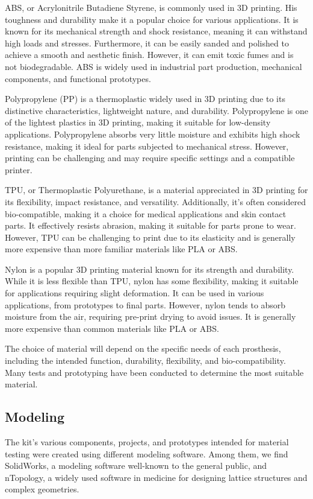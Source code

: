 ABS, or Acrylonitrile Butadiene Styrene, is commonly used in 3D printing. His toughness and durability make it a popular choice for various applications. It is known for its mechanical strength and shock resistance, meaning it can withstand high loads and stresses. Furthermore, it can be easily sanded and polished to achieve a smooth and aesthetic finish. However, it can emit toxic fumes and is not biodegradable. ABS is widely used in industrial part production, mechanical components, and functional prototypes. 

Polypropylene (PP) is a thermoplastic widely used in 3D printing due to its distinctive characteristics, lightweight nature, and durability. Polypropylene is one of the lightest plastics in 3D printing, making it suitable for low-density applications. Polypropylene absorbs very little moisture and exhibits high shock resistance, making it ideal for parts subjected to mechanical stress. However, printing can be challenging and may require specific settings and a compatible printer.

TPU, or Thermoplastic Polyurethane, is a material appreciated in 3D printing for its flexibility, impact resistance, and versatility. Additionally, it’s often considered bio-compatible, making it a choice for medical applications and skin contact parts. It effectively resists abrasion, making it suitable for parts prone to wear. However, TPU can be challenging to print due to its elasticity and is generally more expensive than more familiar materials like PLA or ABS.

Nylon is a popular 3D printing material known for its strength and durability. While it is less flexible than TPU, nylon has some flexibility, making it suitable for applications requiring slight deformation. It can be used in various applications, from prototypes to final parts. However, nylon tends to absorb moisture from the air, requiring pre-print drying to avoid issues. It is generally more expensive than common materials like PLA or ABS.

The choice of material will depend on the specific needs of each prosthesis, including the intended function, durability, flexibility, and bio-compatibility. Many tests and prototyping have been conducted to determine the most suitable material.

\subsection{Modeling}

The kit’s various components, projects, and prototypes intended for material testing were created using different modeling software. Among them, we find SolidWorks, a modeling software well-known to the general public, and nTopology, a widely used software in medicine for designing lattice structures and complex geometries.

